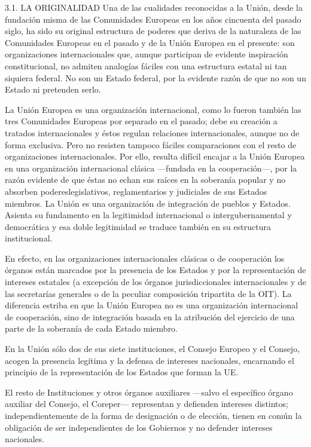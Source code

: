 \documentclass[10pt,a4paper]{article}
\begin{document}
3.1. LA ORIGINALIDAD
Una de las cualidades reconocidas a la Unión, desde la fundación misma de las Comunidades Europeas en los años cincuenta del pasado siglo, ha sido su original estructura de poderes que deriva de la naturaleza de las Comunidades Europeas en el pasado y de la Unión Europea en el presente: son organizaciones internacionales que, aunque participan de evidente inspiración constitucional, no admiten analogías fáciles con una estructura estatal ni tan siquiera federal. No son un Estado federal, por la evidente razón de que no son un Estado ni pretenden serlo.

La Unión Europea es una organización internacional, como lo fueron también las tres Comunidades Europeas por separado en el pasado; debe su creación a tratados internacionales y éstos regulan relaciones internacionales, aunque no de forma exclusiva. Pero no resisten tampoco fáciles comparaciones con el resto de organizaciones internacionales. Por ello, resulta difícil encajar a la Unión Europea en una organización internacional clásica —fundada en la cooperación—, por la razón evidente de que éstas no echan sus raíces en la soberanía popular y no absorben podereslegislativos, reglamentarios y judiciales de sus Estados miembros. La Unión es una organización de integración de pueblos y Estados. Asienta su fundamento en la legitimidad internacional o intergubernamental y democrática y esa doble legitimidad se traduce también en su estructura institucional.

En efecto, en las organizaciones internacionales clásicas o de cooperación los órganos están marcados por la presencia de los Estados y por la representación de intereses estatales (a excepción de los órganos jurisdiccionales internacionales y de las secretarías generales o de la peculiar composición tripartita de la OIT). La diferencia estriba en que la Unión Europea no es una organización internacional de cooperación, sino de integración basada en la atribución del ejercicio de una parte de la soberanía de cada Estado miembro.

En la Unión sólo dos de sus siete instituciones, el Consejo Europeo y el Consejo, acogen la presencia legítima y la defensa de intereses nacionales, encarnando el principio de la representación de los Estados que forman la UE.

El resto de Instituciones y otros órganos auxiliares —salvo el específico órgano auxiliar del Consejo, el Coreper— representan y defienden intereses distintos; independientemente de la forma de designación o de elección, tienen en común la obligación de ser independientes de los Gobiernos y no defender intereses nacionales.
\end{document}
